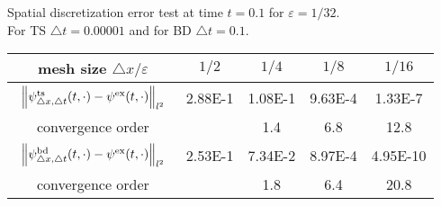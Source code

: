 \documentclass[leqno,final]{siamltex}
\numberwithin{equation}{section}
\newcounter{me}
\begin{document}
\begin{table}[htbp]
\begin{center}
{Spatial discretization error test at time $t=0.1$ for ${{\varepsilon }}=1/32$.\\
For TS ${\triangle} t=0.00001$ and for BD ${\triangle} t=0.1$. }
\begin{tabular}{c|cccc}\hline
mesh size ${\triangle} x/{{\varepsilon }}$& $1/2$ & $1/4$ & $1/8$ &   $1/16$ \\ \hline
$\begin{array}{c}\vspace*{-4mm} \\
\left\|\psi^{\rm ts}_{{\triangle} x,{\triangle} t}(t,\cdot)-\psi^{\rm
ex}(t,\cdot)\right\|_{l^2}\\ \vspace*{-4mm} \end{array}$
 &  2.88E-1 & 1.08E-1 &  9.63E-4 & 1.33E-7 \\ \hline
convergence order & & 1.4 & 6.8& 12.8 \\ \hline \hline
$\begin{array}{c}\vspace*{-4mm} \\
\left\|\psi^{\rm bd}_{{\triangle} x,{\triangle} t}(t,\cdot)-\psi^{\rm
ex}(t,\cdot)\right\|_{l^2}\\ \vspace*{-4mm} \end{array}$
 &  2.53E-1& 7.34E-2 &  8.97E-4 &  4.95E-10 \\ \hline
convergence order & & 1.8& 6.4& 20.8  \\ \hline 
\end{tabular}\vspace{5mm}


\end{center}
\end{table}
\end{document}
